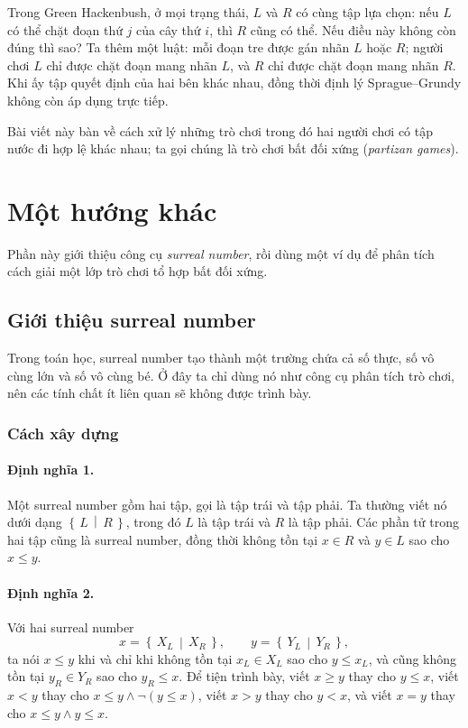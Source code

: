 \documentclass[11pt]{article}
\newcommand{\Gpos}[2]{\left\{\,#1\,\middle|\,#2\,\right\}}
\begin{document}
Trong Green Hackenbush, ở mọi trạng thái, \(L\) và \(R\) có cùng tập lựa chọn:
nếu \(L\) có thể chặt đoạn thứ \(j\) của cây thứ \(i\), thì \(R\) cũng có thể.
Nếu điều này không còn đúng thì sao? Ta thêm một luật: mỗi đoạn tre được gán
nhãn \(L\) hoặc \(R\); người chơi \(L\) chỉ được chặt đoạn mang nhãn \(L\), và
\(R\) chỉ được chặt đoạn mang nhãn \(R\). Khi ấy tập quyết định của hai bên
khác nhau, đồng thời định lý Sprague--Grundy không còn áp dụng trực tiếp.

Bài viết này bàn về cách xử lý những trò chơi trong đó hai người chơi có tập
nước đi hợp lệ khác nhau; ta gọi chúng là trò chơi bất đối xứng
(\emph{partizan games}).

\section{Một hướng khác}

Phần này giới thiệu công cụ \emph{surreal number}, rồi dùng một ví dụ để phân
tích cách giải một lớp trò chơi tổ hợp bất đối xứng.

\subsection{Giới thiệu surreal number}

Trong toán học, surreal number tạo thành một trường chứa cả số thực, số vô
cùng lớn và số vô cùng bé. Ở đây ta chỉ dùng nó như công cụ phân tích trò
chơi, nên các tính chất ít liên quan sẽ không được trình bày.

\subsubsection{Cách xây dựng}

\paragraph{Định nghĩa 1.}
Một surreal number gồm hai tập, gọi là tập trái và tập phải. Ta thường viết
nó dưới dạng \(\Gpos{L}{R}\), trong đó \(L\) là tập trái và \(R\) là tập phải.
Các phần tử trong hai tập cũng là surreal number, đồng thời không tồn tại
\(x\in R\) và \(y\in L\) sao cho \(x\le y\).

\paragraph{Định nghĩa 2.}
Với hai surreal number
\[
  x=\Gpos{X_L}{X_R},\qquad y=\Gpos{Y_L}{Y_R},
\]
ta nói \(x\le y\) khi và chỉ khi không tồn tại \(x_L\in X_L\) sao cho
\(y\le x_L\), và cũng không tồn tại \(y_R\in Y_R\) sao cho \(y_R\le x\).
Để tiện trình bày, viết \(x\ge y\) thay cho \(y\le x\), viết
\(x<y\) thay cho \(x\le y\land \neg(y\le x)\), viết \(x>y\) thay cho \(y<x\),
và viết \(x=y\) thay cho \(x\le y\land y\le x\).
\end{document}
